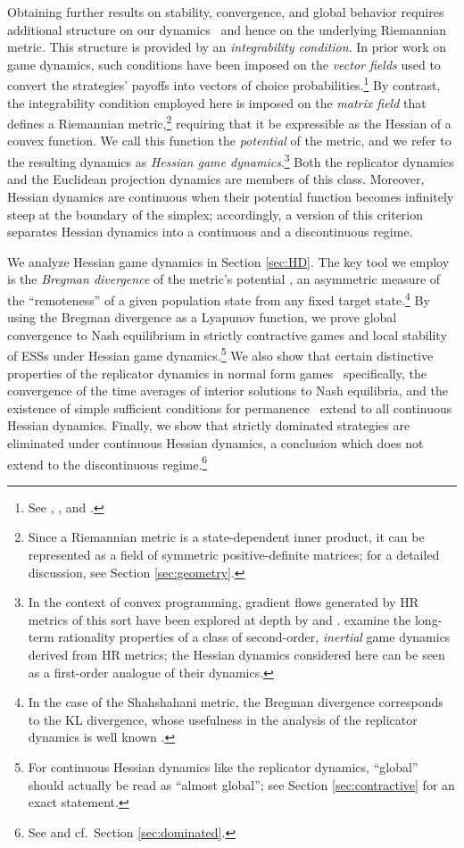 \documentclass[reqno]{amsart}
\theoremstyle{plain}
\theoremstyle{definition}
\theoremstyle{remark}
\numberwithin{equation}{section}
\numberwithin{theorem}{section}
\begin{document}
Obtaining further results on stability, convergence, and global behavior requires additional structure on our dynamics \textendash\ and hence on the underlying Riemannian metric.
This structure is provided by an \emph{integrability condition}.   
In prior work on game dynamics, such conditions have been imposed on the \emph{vector fields} used to convert the strategies' payoffs into vectors of choice probabilities.\footnote{See \cite{HMC01b}, \cite{HS07}, and \cite{San10c}.}
By contrast, the integrability condition employed here is imposed on the \emph{matrix field} that defines a Riemannian metric,\footnote{Since a Riemannian metric is a state-dependent inner product, it can be represented as a field of symmetric positive-definite matrices; for a detailed discussion, see Section \ref{sec:geometry}.}
requiring that it be expressible as the Hessian of a convex function.
We call this function the \emph{potential} of the metric, and we refer to the resulting dynamics as \emph{Hessian game dynamics}.\footnote{In the context of convex programming, gradient flows generated by \ac{HR} metrics of this sort have been explored at depth by \cite{BT03} and \cite{ABB04}.
\cite{LM15} examine the long-term rationality properties of a class of second-order, \emph{inertial} game dynamics derived from \ac{HR} metrics;
the Hessian dynamics considered here can be seen as a first-order analogue of their dynamics.}
Both the replicator dynamics and the Euclidean projection dynamics are members of this class.
Moreover, Hessian dynamics are continuous when their potential function becomes infinitely steep at the boundary of the simplex;
accordingly, a version of this criterion separates Hessian dynamics into a continuous and a discontinuous regime.

We analyze Hessian game dynamics in Section \ref{sec:HD}.
The key tool we employ is the \emph{Bregman divergence} of the metric's potential  \citep{Bre67}, an asymmetric measure of the ``remoteness'' of a given population state from any fixed target state.\footnote{In the case of the Shahshahani metric, the Bregman divergence corresponds to the \acl{KL} divergence, whose usefulness in the analysis of the replicator dynamics is well known \citep{Wei95,HS98}.}
By using the Bregman divergence as a Lyapunov function, we prove global convergence to Nash equilibrium in strictly contractive games and local stability of \aclp{ESS} under Hessian game dynamics.\footnote{For continuous Hessian dynamics
like the replicator dynamics,
``global'' should actually be read as ``almost global'';
see Section \ref{sec:contractive} for an exact statement.}
We also show that certain distinctive properties of the replicator dynamics in normal form games \textendash\ specifically, the convergence of the time averages of interior solutions to Nash equilibria, and the existence of simple sufficient conditions for permanence \textendash\ extend to all continuous Hessian dynamics.
Finally, we show that strictly dominated strategies are eliminated under continuous Hessian dynamics, a conclusion which does not extend to the discontinuous regime.\footnote{See \cite{SDL08} and cf.~Section \ref{sec:dominated}.}
\end{document}
